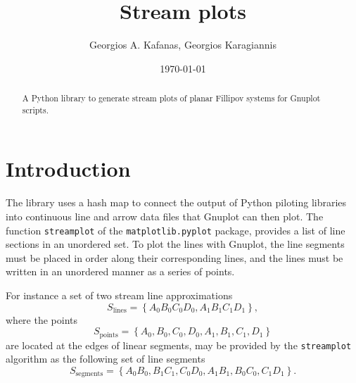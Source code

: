 \documentclass[english, a4paper]{article}
\begin{document}
\graphicspath{{Resources/Images/}{Resources/Diagrams/}}

\onehalfspacing
{}

\title{Stream plots}
\author{Georgios A. Kafanas, Georgios Karagiannis}
\date{\today}

\maketitle

\begin{abstract}
A Python library to generate stream plots of planar Fillipov systems for Gnuplot scripts.
\end{abstract}

\thispagestyle{empty}
\restoregeometry

\clearpage

\tableofcontents
\listoffigures
\listoftables
\listofalgorithms

\clearpage


\section{Introduction}

The library uses a hash map to connect the output of Python piloting libraries into continuous line and arrow data files that Gnuplot can then plot. The function \texttt{streamplot} of the \texttt{matplotlib.pyplot} package, provides a list of line sections in an unordered set. To plot the lines with Gnuplot, the line segments must be placed in order along their corresponding lines, and the lines must be written in an unordered manner as a series of points.

For instance a set of two stream line approximations
\begin{equation}
	S_{\mathrm{lines}} = \left\{ A_{0}B_{0}C_{0}D_{0}, A_{1}B_{1}C_{1}D_{1} \right\},
\end{equation}
where the points
\begin{equation}
	S_{\mathrm{points}} = \left\{ A_{0}, B_{0}, C_{0}, D_{0}, A_{1}, B_{1}, C_{1}, D_{1} \right\}
\end{equation}
are located at the edges of linear segments, may be provided by the \texttt{streamplot} algorithm as the following set of line segments
\begin{equation}
	S_{\mathrm{segments}} = \left\{ A_{0}B_{0}, B_{1} C_{1}, C_{0}D_{0}, A_{1}B_{1}, B_{0}C_{0}, C_{1} D_{1} \right\}.
\end{equation}
\end{document}
